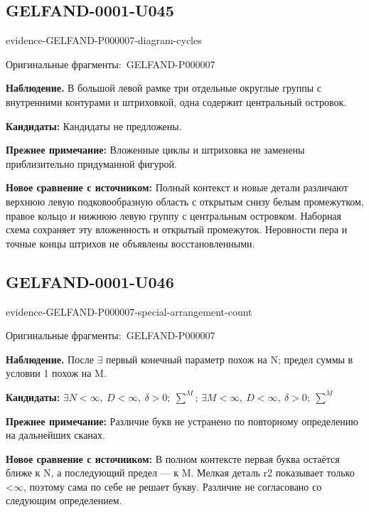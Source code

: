 \documentclass[11pt]{article}
\newcommand{\EvidenceBlock}[4]{%
 \par\smallskip\noindent\begin{minipage}{\linewidth}
 \begin{minipage}[t]{.47\linewidth}\vspace{0pt}\centering
 \csname evidence-#1-#2\endcsname\par
 {\scriptsize\SourceCropCaption\ #1}\par
 \end{minipage}\hfill
 \begin{minipage}[t]{.49\linewidth}\vspace{0pt}\raggedright
 {\small\color{orange!65!black}\textbf{#4} #3}\par
 \end{minipage}
 \end{minipage}\par\smallskip}
\newcommand{\SourceCropCaption}{Оригинальные фрагменты:}\newcommand{\ReadingCaption}{Сомнительное чтение.}\newcommand{\IncompleteCaption}{Неразобранный фрагмент.}\newcommand{\DiagramCaption}{Рисунок и набранное описание.}
\begin{document}
\subsection*{GELFAND-0001-U045}
\EvidenceBlock{GELFAND-P000007}{diagram-cycles}{В большой левой рамке три отдельные округлые группы с внутренними контурами и штриховкой, одна содержит центральный островок.}{Наблюдение.}
\par\smallskip\noindent\textbf{Кандидаты: } Кандидаты не предложены.\par
\par\smallskip\noindent\textbf{Прежнее примечание: } Вложенные циклы и штриховка не заменены приблизительно придуманной фигурой.\par
\par\smallskip\noindent\textbf{Новое сравнение с источником: } Полный контекст и новые детали различают верхнюю левую подковообразную область с открытым снизу белым промежутком, правое кольцо и нижнюю левую группу с центральным островком. Наборная схема сохраняет эту вложенность и открытый промежуток. Неровности пера и точные концы штрихов не объявлены восстановленными.\par

\subsection*{GELFAND-0001-U046}
\EvidenceBlock{GELFAND-P000007}{special-arrangement-count}{После \(\exists\) первый конечный параметр похож на N; предел суммы в условии 1 похож на M.}{Наблюдение.}
\par\smallskip\noindent\textbf{Кандидаты: } \(\exists N<\infty,\ D<\infty,\ \delta>0;\ \sum^{M}\); \(\exists M<\infty,\ D<\infty,\ \delta>0;\ \sum^{M}\)\par
\par\smallskip\noindent\textbf{Прежнее примечание: } Различие букв не устранено по повторному определению на дальнейших сканах.\par
\par\smallskip\noindent\textbf{Новое сравнение с источником: } В полном контексте первая буква остаётся ближе к N, а последующий предел — к M. Мелкая деталь r2 показывает только <\(\infty\), поэтому сама по себе не решает букву. Различие не согласовано со следующим определением.\par
\end{document}
